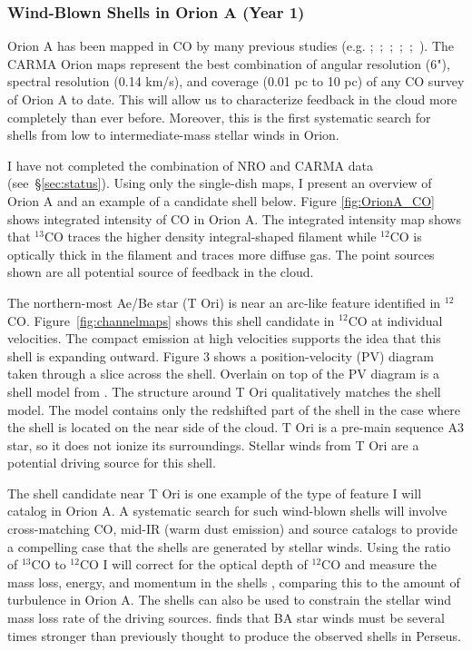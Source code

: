         \subsubsection{Wind-Blown Shells in Orion A (Year 1)}\label{sec:paper1}
Orion A has been mapped in CO by many previous studies (e.g. \citet{Bally87};~\citet{Wilson05};~\citet{Shimajiri11};~\citet{Buckle12};~\citet{Berne14};~\citet{Nishimura15}). The CARMA Orion maps represent the best combination of angular resolution (6"), spectral resolution (0.14 km/s), and coverage (0.01 pc to 10 pc) of any CO survey of Orion A to date. This will allow us to characterize feedback in the cloud more completely than ever before. Moreover, this is the first systematic search for shells from low to intermediate-mass stellar winds in Orion.
        
I have not completed the combination of NRO and CARMA data (see~\S\ref{sec:status}). Using only the single-dish maps, I present an overview of Orion A and an example of a candidate shell below. Figure \ref{fig:OrionA_CO} shows integrated intensity of CO in Orion A. The integrated intensity map shows that $^{13}$CO traces the higher density integral-shaped filament while $^{12}$CO is optically thick in the filament and traces more diffuse gas. The point sources shown are all potential source of feedback in the cloud.

The northern-most Ae/Be star (T Ori) is near an arc-like feature identified in $^{12}$CO. Figure~\ref{fig:channelmaps} shows this shell candidate in $^{12}$CO at individual velocities. The compact emission at high velocities supports the idea that this shell is expanding outward. Figure 3 shows a position-velocity (PV) diagram taken through a slice across the shell. Overlain on top of the PV diagram is a shell model from \citet{Arce_2011}. The structure around T Ori qualitatively matches the shell model. The model contains only the redshifted part of the shell in the case where the shell is located on the near side of the cloud.  T Ori is a pre-main sequence A3 star, so it does not ionize its surroundings. Stellar winds from T Ori are a potential driving source for this shell.

The shell candidate near T Ori is one example of the type of feature I will catalog in Orion A. A systematic search for such wind-blown shells will involve cross-matching CO, mid-IR (warm dust emission) and source catalogs to provide a compelling case that the shells are generated by stellar winds. Using the ratio of $^{13}$CO to $^{12}$CO I will correct for the optical depth of $^{12}$CO and measure the mass loss, energy, and momentum in the shells \cite{Arce_2011}, comparing this to the amount of turbulence in Orion A. The shells can also be used to constrain the stellar wind mass loss rate of the driving sources. \citet{Offner15} finds that BA star winds must be several times stronger than previously thought to produce the observed shells in Perseus.
